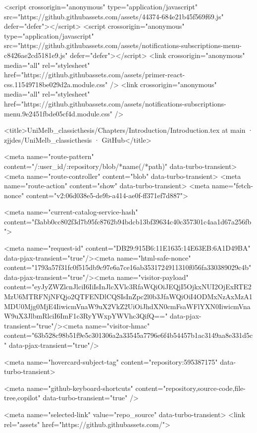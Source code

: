   <script crossorigin="anonymous" type="application/javascript" src="https://github.githubassets.com/assets/44374-684e21b45f569f69.js" defer="defer"></script>
<script crossorigin="anonymous" type="application/javascript" src="https://github.githubassets.com/assets/notifications-subscriptions-menu-c8426ae2cd5181e9.js" defer="defer"></script>
<link crossorigin="anonymous" media="all" rel="stylesheet" href="https://github.githubassets.com/assets/primer-react-css.11549718be029d2a.module.css" />
<link crossorigin="anonymous" media="all" rel="stylesheet" href="https://github.githubassets.com/assets/notifications-subscriptions-menu.9e2451fbde05cf4d.module.css" />


  <title>UniMelb_classicthesis/Chapters/Introduction/Introduction.tex at main · zjjdes/UniMelb_classicthesis · GitHub</title>



  <meta name="route-pattern" content="/:user_id/:repository/blob/*name(/*path)" data-turbo-transient>
  <meta name="route-controller" content="blob" data-turbo-transient>
  <meta name="route-action" content="show" data-turbo-transient>
  <meta name="fetch-nonce" content="v2:06d038e5-de9b-a414-ae0f-ff371ef7d887">

    
  <meta name="current-catalog-service-hash" content="f3abb0cc802f3d7b95fc8762b94bdcb13bf39634c40c357301c4aa1d67a256fb">


  <meta name="request-id" content="DB29:915B6:11E1635:14E63EB:6A1D49BA" data-pjax-transient="true"/><meta name="html-safe-nonce" content="1793a57f31fc0f515db9c97e6a7ce16ab3531724911310f056fa330389029c4b" data-pjax-transient="true"/><meta name="visitor-payload" content="eyJyZWZlcnJlciI6IiIsInJlcXVlc3RfaWQiOiJEQjI5OjkxNUI2OjExRTE2MzU6MTRFNjNFQjo2QTFENDlCQSIsInZpc2l0b3JfaWQiOiI4ODMxNzAxMzA1MDU0Mjg0MjE4IiwicmVnaW9uX2VkZ2UiOiJhdXN0cmFsaWFlYXN0IiwicmVnaW9uX3JlbmRlciI6ImF1c3RyYWxpYWVhc3QifQ==" data-pjax-transient="true"/><meta name="visitor-hmac" content="63b528c98b51f9e5c301306a2a33545a7796e6f4b54457b1ac3149aa8e331d5c" data-pjax-transient="true"/>


    <meta name="hovercard-subject-tag" content="repository:595387175" data-turbo-transient>


  <meta name="github-keyboard-shortcuts" content="repository,source-code,file-tree,copilot" data-turbo-transient="true" />
  

  <meta name="selected-link" value="repo_source" data-turbo-transient>
  <link rel="assets" href="https://github.githubassets.com/">

